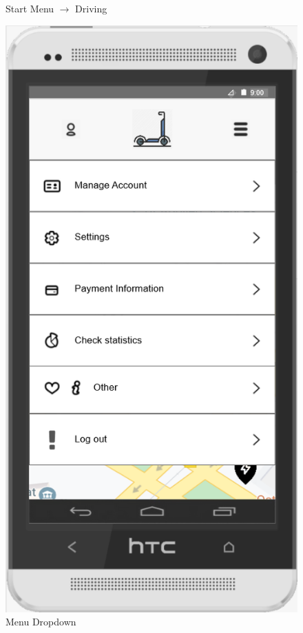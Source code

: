 \documentclass[a4paper, 12pt]{article}
\begin{document}
\begin{figure} [htbp]
\begin{center}
\begin{minipage}{0.45\textwidth}
\begin{center}
            \end{center}
            \caption{Start Menu $\rightarrow$ Driving}
        \end{minipage}\hfill
        \begin{minipage}{0.45\textwidth}
            \begin{center}
                \includegraphics[scale=0.65]{images/prototypes/02-menu-dropdown.png}
            \end{center}
            \caption{Menu Dropdown}
        \end{minipage}
    \end{center}
\end{figure}
\end{document}
